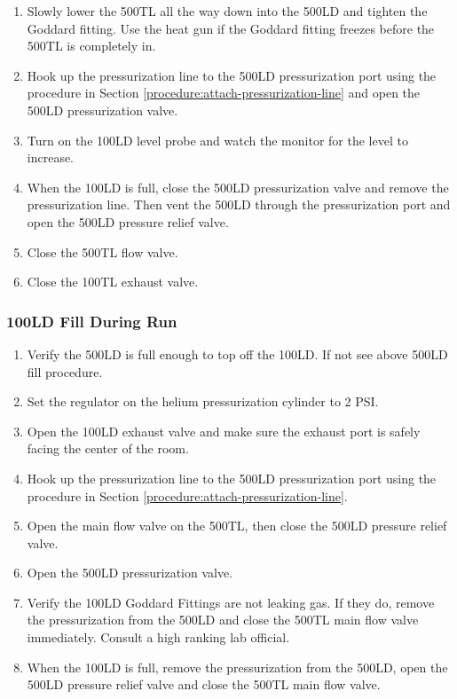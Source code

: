 \begin{enumerate}
 \item Slowly lower the 500TL all the way down into the 500LD and tighten the Goddard fitting.  Use the heat gun if the Goddard fitting freezes before the 500TL is completely in.
 \item Hook up the pressurization line to the 500LD pressurization port using the procedure in Section \ref{procedure:attach-pressurization-line} and open the 500LD pressurization valve.
 \item Turn on the 100LD level probe and watch the monitor for the level to increase.
 \item When the 100LD is full, close the 500LD pressurization valve and remove the pressurization line.  Then vent the 500LD through the pressurization port and open the 500LD pressure relief valve.
 \item Close the 500TL flow valve.
 \item Close the 100TL exhaust valve.
\end{enumerate}

\subsubsection{100LD Fill During Run}

\begin{enumerate}
 
 \item Verify the 500LD is full enough to top off the 100LD.  If not see above 500LD fill procedure.
 \item Set the regulator on the helium pressurization cylinder to 2 PSI.
 \item Open the 100LD exhaust valve and make sure the exhaust port is safely facing the center of the room.
 \item Hook up the pressurization line to the 500LD pressurization port using the procedure in Section \ref{procedure:attach-pressurization-line}.
 \item Open the main flow valve on the 500TL, then close the 500LD pressure relief valve.
 \item Open the 500LD pressurization valve.
 \item Verify the 100LD Goddard Fittings are not leaking gas.  If they do, remove the pressurization from the 500LD and close the 500TL main flow valve immediately.  Consult a high ranking lab official.
 \item When the 100LD is full, remove the pressurization from the 500LD, open the 500LD pressure relief valve and close the 500TL main flow valve.
 
\end{enumerate}



